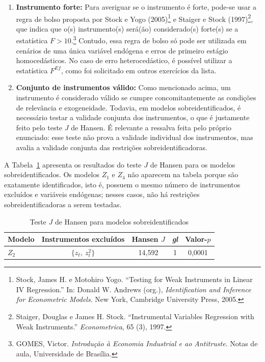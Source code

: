 \documentclass[12pt,a4paper]{article}
\begin{document}
\begin{enumerate}[label=\textbf{\arabic*.}]
\begin{enumerate}[label=(\roman*)]
    \item \textbf{Instrumento forte:} 
    Para averiguar se o instrumento é forte, pode-se usar a regra de bolso proposta por Stock e Yogo (2005)\footnote{Stock, James H. e Motohiro Yogo. “Testing for Weak Instruments in Linear IV Regression.” In: Donald W. Andrews (org.), \textit{Identification and Inference for Econometric Models}. New York, Cambridge University Press, 2005.} 
    e Staiger e Stock (1997)\footnote{Staiger, Douglas e James H. Stock. “Instrumental Variables Regression with Weak Instruments.” \textit{Econometrica}, 65 (3), 1997.}, que indica que o(s) instrumento(s) será(ão) considerado(s) forte(s) se a estatística $F>10$.\footnote{GOMES, Victor. \textit{Introdução à Economia Industrial e ao Antitruste}. Notas de aula, Universidade de Brasília.} 
    Contudo, essa regra de bolso só pode ser utilizada em cenários de uma única variável endógena e erros de primeiro estágio homocedásticos. No caso de erro heterocedástico, é possível utilizar a estatística $F^{Ef}$, como foi solicitado em outros exercícios da lista.

    \item \textbf{Conjunto de instrumentos válido:} 
    Como mencionado acima, um instrumento é considerado válido se cumpre concomitantemente as condições de relevância e exogeneidade. Todavia, em modelos sobreidentificados, é necessário testar a validade conjunta dos instrumentos, o que é justamente feito pelo teste $J$ de Hansen. É relevante a ressalva feita pelo próprio enunciado: esse teste não prova a validade individual dos instrumentos, mas avalia a validade conjunta das restrições sobreidentificadoras.
\end{enumerate}

A Tabela~\ref{tab:hansen_sobreidentificados} apresenta os resultados do teste $J$ de Hansen para os modelos sobreidentificados. Os modelos $Z_1$ e $Z_4$ não aparecem na tabela porque são exatamente identificados, isto é, possuem o mesmo número de instrumentos excluídos e variáveis endógenas; nesses casos, não há restrições sobreidentificadoras a serem testadas.

\begin{table}[H]
    \centering
    \small
    \caption{Teste $J$ de Hansen para modelos sobreidentificados}
    \label{tab:hansen_sobreidentificados}
    \setlength{\tabcolsep}{5pt}
    \begin{tabular}{lcccc}
        \hline
        Modelo 
        & Instrumentos excluídos 
        & Hansen $J$ 
        & \textit{gl} 
        & Valor-$p$ \\
        \hline
        $Z_2$ 
        & $\{z_t,\ z_t^2\}$ 
        & 14{,}592 
        & 1 
        & 0{,}0001 \\


\end{tabular}
\end{table}
\end{enumerate}
\end{document}
